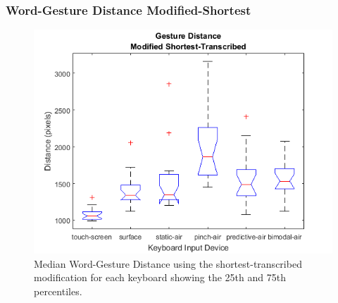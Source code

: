 \subsubsection{Word-Gesture Distance Modified-Shortest}
\begin{figure}[h]
	\centering
	\includegraphics{fig_distance_short_boxplot}
	\caption[Word-Gesture Distance Boxplot for Modified-Shortest]{Median Word-Gesture Distance using the shortest-transcribed modification for each keyboard showing the 25th and 75th percentiles.}
	\label{fig_distance_short_boxplot}
\end{figure}

